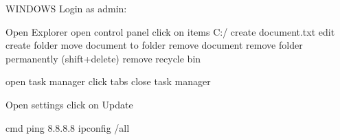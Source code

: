 WINDOWS
Login as admin:

Open Explorer
open control panel
click on items
C:/
create document.txt
edit
create folder
move document to folder
remove document
remove folder permanently (shift+delete)
remove recycle bin 

open task manager
click tabs 
close task manager

Open settings
click on Update

cmd
ping 8.8.8.8
ipconfig /all